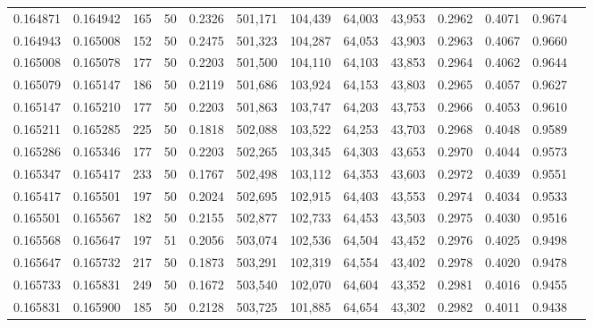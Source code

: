 \begin{tabular}{rrrrrrrrrrrrr}
0.164871 & 0.164942 &   165 &  50 &                                     0.2326 & 501,171 & 104,439 &  64,003 &  43,953 & 0.2962 & 0.4071 & 0.9674 \\
0.164943 & 0.165008 &   152 &  50 &                                     0.2475 & 501,323 & 104,287 &  64,053 &  43,903 & 0.2963 & 0.4067 & 0.9660 \\
0.165008 & 0.165078 &   177 &  50 &                                     0.2203 & 501,500 & 104,110 &  64,103 &  43,853 & 0.2964 & 0.4062 & 0.9644 \\
0.165079 & 0.165147 &   186 &  50 &                                     0.2119 & 501,686 & 103,924 &  64,153 &  43,803 & 0.2965 & 0.4057 & 0.9627 \\
0.165147 & 0.165210 &   177 &  50 &                                     0.2203 & 501,863 & 103,747 &  64,203 &  43,753 & 0.2966 & 0.4053 & 0.9610 \\
0.165211 & 0.165285 &   225 &  50 &                                     0.1818 & 502,088 & 103,522 &  64,253 &  43,703 & 0.2968 & 0.4048 & 0.9589 \\
0.165286 & 0.165346 &   177 &  50 &                                     0.2203 & 502,265 & 103,345 &  64,303 &  43,653 & 0.2970 & 0.4044 & 0.9573 \\
0.165347 & 0.165417 &   233 &  50 &                                     0.1767 & 502,498 & 103,112 &  64,353 &  43,603 & 0.2972 & 0.4039 & 0.9551 \\
0.165417 & 0.165501 &   197 &  50 &                                     0.2024 & 502,695 & 102,915 &  64,403 &  43,553 & 0.2974 & 0.4034 & 0.9533 \\
0.165501 & 0.165567 &   182 &  50 &                                     0.2155 & 502,877 & 102,733 &  64,453 &  43,503 & 0.2975 & 0.4030 & 0.9516 \\
0.165568 & 0.165647 &   197 &  51 &                                     0.2056 & 503,074 & 102,536 &  64,504 &  43,452 & 0.2976 & 0.4025 & 0.9498 \\
0.165647 & 0.165732 &   217 &  50 &                                     0.1873 & 503,291 & 102,319 &  64,554 &  43,402 & 0.2978 & 0.4020 & 0.9478 \\
0.165733 & 0.165831 &   249 &  50 &                                     0.1672 & 503,540 & 102,070 &  64,604 &  43,352 & 0.2981 & 0.4016 & 0.9455 \\
0.165831 & 0.165900 &   185 &  50 &                                     0.2128 & 503,725 & 101,885 &  64,654 &  43,302 & 0.2982 & 0.4011 & 0.9438 \\

\end{tabular}
